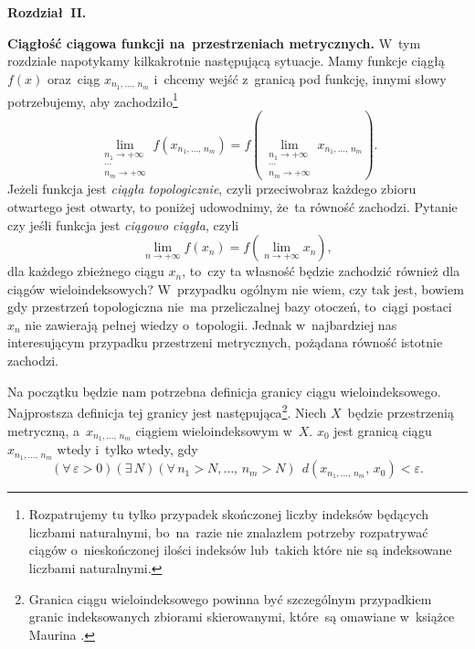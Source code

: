 \documentclass[a4paper,11pt]{article}
\begin{document}
\noindent
\textbf{Rozdział~II.}

\vspace{\spaceFour}


\start \textbf{Ciągłość ciągowa funkcji na~przestrzeniach metrycznych.}
W~tym rozdziale napotykamy kilkakrotnie następującą sytuacje. Mamy
funkcje ciągłą $f( x )$ oraz~ciąg $x_{ n_{ 1 }, \ldots, \, n_{ m } }$
i~chcemy wejść z~granicą pod funkcję, innymi słowy potrzebujemy, aby
zachodziło\footnote{Rozpatrujemy tu tylko przypadek skończonej liczby
  indeksów będących liczbami naturalnymi, bo~na~razie nie znalazłem
  potrzeby rozpatrywać ciągów o~nieskończonej ilości indeksów
  lub~takich które nie są indeksowane liczbami naturalnymi.}
\begin{equation}
  \label{RS-Vol-I-s01-08}
  \lim\limits_{ \substack{ n_{ 1 } \to +\infty \\ \cdots \\  n_{ m } \to +\infty } }
  f( x_{ n_{ 1 }, \ldots, \, n_{ m } } )
  =
  f( \lim_{ \substack{ n_{ 1 } \to +\infty \\ \cdots \\ n_{ m } \to +\infty } }
  x_{ n_{ 1 }, \ldots, \, n_{ m } } ).
\end{equation}
Jeżeli funkcja jest \emph{ciągła topologicznie}, czyli przeciwobraz
każdego zbioru otwartego jest otwarty, to poniżej udowodnimy, że~ta
równość zachodzi. Pytanie czy jeśli funkcja jest \emph{ciągowo
  ciągła}, czyli
\begin{equation*}
  \label{RS-Vol-I-s01-09}
  \lim\limits_{ n \to +\infty } f( x_{ n } )
  = f( \lim\limits_{ n \to +\infty } x_{ n } ),
\end{equation*}
dla każdego zbieżnego ciągu $x_{ n }$, to~czy ta własność będzie
zachodzić również dla ciągów wieloindeksowych? W~przypadku ogólnym nie
wiem, czy tak jest, bowiem gdy przestrzeń topologiczna nie~ma
przeliczalnej bazy otoczeń, to~ciągi postaci $x_{ n }$ nie zawierają
pełnej wiedzy o~topologii. Jednak w~najbardziej nas interesującym
przypadku przestrzeni metrycznych, pożądana równość istotnie zachodzi.

Na początku będzie nam potrzebna definicja granicy ciągu
wieloindeksowego. Najprostsza definicja tej granicy jest
następująca\footnote{Granica ciągu wieloindeksowego powinna być
  szczególnym przypadkiem granic indeksowanych zbiorami skierowanymi,
  które~są omawiane w~książce Maurina \cite{MaurinAnalizaVolI1974}.}. Niech
$X$~będzie przestrzenią metryczną, a~$x_{ n_{ 1 }, \ldots, \, n_{ m } }$
ciągiem wieloindeksowym w~$X$. $x_{ 0 }$ jest granicą ciągu
$x_{ n_{ 1 }, \ldots, \, n_{ m } }$ wtedy i~tylko wtedy, gdy
\begin{equation}
  \label{RS-Vol-I-s01-10}
  ( \forall \, \varepsilon > 0) ( \exists \, N )
  ( \forall \, n_{ 1 } > N, \ldots, \, n_{ m } > N ) \;\,
  d( x_{ n_{ 1 }, \ldots, \, n_{ m } }, \, x_{ 0 } ) < \varepsilon.
\end{equation}
\end{document}
